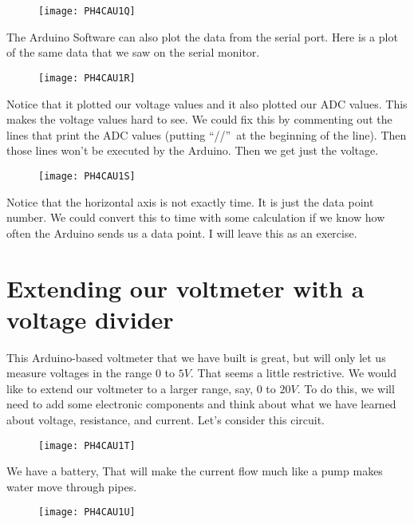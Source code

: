 \begin{figure}[h!]
	\centering
	\texttt{[image: PH4CAU1Q]}
\end{figure}

The Arduino Software can also plot the data from the serial port. Here is a
plot of the same data that we saw on the serial monitor. 

\begin{figure}[h!]
	\centering
	\texttt{[image: PH4CAU1R]}
\end{figure}
Notice that it plotted our voltage values and it also plotted our ADC values. This makes the voltage values hard to see. We could fix this by commenting out the lines that print the ADC values (putting \textquotedblleft //\textquotedblright\ at the
beginning of the line). Then those lines won't be executed by the Arduino.
Then we get just the voltage. 

\begin{figure}[h!]
	\centering
    \texttt{[image: PH4CAU1S]}
\end{figure}

Notice that the horizontal axis is not exactly time. It is just the data point number. We could convert this to time with some calculation if we know how often the Arduino sends us a data point. I will leave this as an exercise.

\section{Extending our voltmeter with a voltage divider\label{Voltmeter with
Voltage Divider}}

This Arduino-based voltmeter that we have built is great, but will only let
us measure voltages in the range $0$ to $5\unit{V}.$ That seems a little
restrictive. We would like to extend our voltmeter to a larger range, say, $%
0 $ to $20\unit{V}.$ To do this, we will need to add some electronic
components and think about what we have learned about voltage, resistance,
and current. Let's consider this circuit.

\begin{figure}[h!]
	\centering
	\texttt{[image: PH4CAU1T]}
\end{figure}

We have a battery, That will make the current flow much like a pump makes water move through pipes.

\begin{figure}[h!]
	\centering
	\texttt{[image: PH4CAU1U]}
\end{figure}

